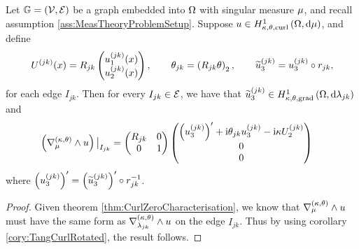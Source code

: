 \begin{theorem} \label{thm:TangCurlGraph}
	Let $\mathbb{G}=\left( \mathcal{V}, \mathcal{E} \right)$ be a graph embedded into $\Omega$ with singular measure $\mu$, and recall assumption \ref{ass:MeasTheoryProblemSetup}.
	Suppose $u\in H^1_{\kappa,\theta,\mathrm{curl}}\left( \Omega, \mathrm{d}\mu \right)$, and define
	\begin{align*}
		U^{(jk)}(x) = R_{jk}\begin{pmatrix} u_1^{(jk)}(x) \\ u_2^{(jk)}(x) \end{pmatrix},
		\qquad \theta_{jk} = \left(  R_{jk}\theta  \right)_2,
		\qquad \widetilde{u}_3^{(jk)} = u_3^{(jk)} \circ r_{jk},
	\end{align*}
	for each edge $I_{jk}$.
	Then for every $I_{jk}\in\mathcal{E}$, we have that $\widetilde{u}_3^{(jk)}\in H^1_{\kappa,\theta,\mathrm{grad}}\left( \Omega, \mathrm{d}\lambda_{jk} \right)$ and
	\begin{align*}
		\left(  \nabla_{\mu}^{\left( \kappa, \theta \right)}\wedge u  \right)\big\vert_{I_{jk}} &= 
		\begin{pmatrix} R_{jk} & 0 \\ 0 & 1 \end{pmatrix}
		\begin{pmatrix} \left( u_3^{(jk)} \right)' + \mathrm{i}\theta_{jk} u_3^{(jk)} - \mathrm{i}\kappa U_2^{(jk)} \\ 0 \\ 0 \end{pmatrix}
	\end{align*}
	where $\left( u_3^{(jk)} \right)' = \left( \widetilde{u}_3^{(jk)} \right)' \circ r_{jk}^{-1}$.
\end{theorem}
\begin{proof}
	Given theorem \ref{thm:CurlZeroCharacterisation}, we know that $\nabla_{\mu}^{\left( \kappa, \theta \right)}\wedge u$ must have the same form as $\nabla_{\lambda_{jk}}^{\left( \kappa, \theta \right)}\wedge u$ on the edge $I_{jk}$.
	Thus by using corollary \ref{cory:TangCurlRotated}, the result follows.
\end{proof}

